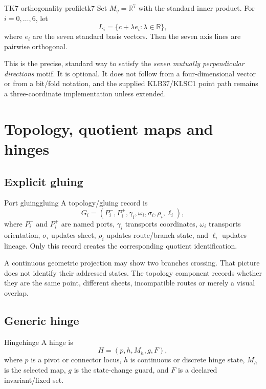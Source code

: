 \documentclass[10pt,a4paper]{article}
\newcommand{\Real}{\mathbb{R}}
\begin{document}
\begin{formaldef}{TK7 orthogonality profile}{tk7}
Set \(M_q=\Real^7\) with the standard inner product. For \(i=0,\ldots,6\), let
\[
L_i=\{c+\lambda e_i:\lambda\in\Real\},
\]
where \(e_i\) are the seven standard basis vectors. Then the seven axis lines are pairwise orthogonal.
\end{formaldef}

This is the precise, standard way to satisfy the \emph{seven mutually perpendicular directions} motif. It is optional. It does not follow from a four-dimensional vector or from a bit/fold notation, and the supplied KLB37/KLSC1 point path remains a three-coordinate implementation unless extended.

\section{Topology, quotient maps and hinges}
\label{sec:topology}

\subsection{Explicit gluing}

\begin{formaldef}{Port gluing}{gluing}
A topology/gluing record is
\[
G_i=(P_i^-,P_i^+,\gamma_i,\omega_i,\sigma_i,\rho_i,\ell_i),
\]
where \(P_i^-\) and \(P_i^+\) are named ports, \(\gamma_i\) transports coordinates, \(\omega_i\) transports orientation, \(\sigma_i\) updates sheet, \(\rho_i\) updates route/branch state, and \(\ell_i\) updates lineage. Only this record creates the corresponding quotient identification.
\end{formaldef}

A continuous geometric projection may show two branches crossing. That picture does not identify their addressed states. The topology component records whether they are the same point, different sheets, incompatible routes or merely a visual overlap.

\subsection{Generic hinge}

\begin{formaldef}{Hinge}{hinge}
A hinge is
\[
H=(p,h,M_h,g,F),
\]
where \(p\) is a pivot or connector locus, \(h\) is continuous or discrete hinge state, \(M_h\) is the selected map, \(g\) is the state-change guard, and \(F\) is a declared invariant/fixed set.
\end{formaldef}
\end{document}
